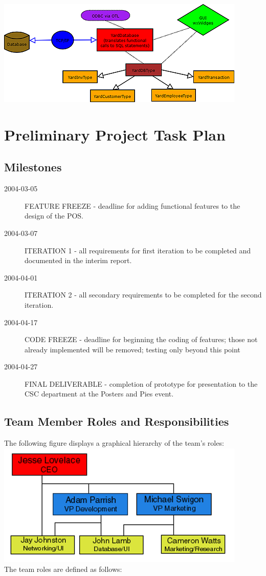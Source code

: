 \documentclass{report}
\begin{document}
\begin{itemize}
    \includegraphics{yardsale_modules.png}\\

\section{Preliminary Project Task Plan}

    \subsection{Milestones}
    \begin{description}
        \item[2004-03-05] FEATURE FREEZE - deadline for adding functional
        features to the design of the POS.
        \item[2004-03-07] ITERATION 1 - all requirements for first
        iteration to be completed and documented in the interim
        report.
        \item[2004-04-01] ITERATION 2 - all secondary requirements
        to be completed for the second iteration.
        \item[2004-04-17] CODE FREEZE - deadline for beginning the
        coding of features; those not already implemented will be removed;
        testing only beyond this point
        \item[2004-04-27] FINAL DELIVERABLE - completion of
        prototype for presentation to the CSC department at the
        Posters and Pies event.
    \end{description}

    \subsection{Team Member Roles and Responsibilities}
    The following figure displays a graphical hierarchy of the team's
    roles:\\
    \includegraphics{organization.png}
    \\The team roles are defined as follows:


\end{itemize}
\end{document}

